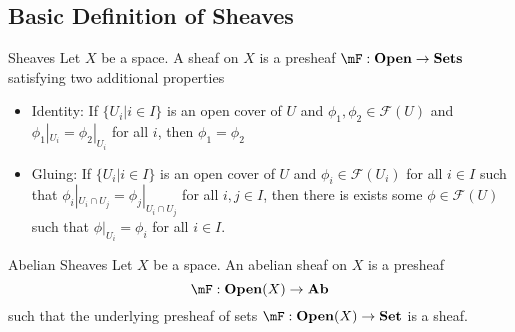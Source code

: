 \documentclass[a4paper]{article}
\begin{document}
\subsection{Basic Definition of Sheaves}
\begin{defn}{Sheaves}{} Let $X$ be a space. A sheaf on $X$ is a presheaf $\mF:\bold{Open}\to\bold{Sets}$ satisfying two additional properties
\begin{itemize}
\item Identity: If $\{U_i|i\in I\}$ is an open cover of $U$ and $\phi_1,\phi_2\in\mathcal{F}(U)$ and $\phi_1|_{U_i}=\phi_2|_{U_i}$ for all $i$, then $\phi_1=\phi_2$
\item Gluing: If $\{U_i|i\in I\}$ is an open cover of $U$ and $\phi_i\in\mathcal{F}(U_i)$ for all $i\in I$ such that $\phi_i|_{U_i\cap U_j}=\phi_j|_{U_i\cap U_j}$ for all $i,j\in I$, then there is exists some $\phi\in\mathcal{F}(U)$ such that $\phi|_{U_i}=\phi_i$ for all $i\in I$. 
\end{itemize}
\end{defn}

\begin{defn}{Abelian Sheaves}{} Let $X$ be a space. An abelian sheaf on $X$ is a presheaf $$\mF:\bold{Open}(X)\to\bold{Ab}$$ such that the underlying presheaf of sets $\mF:\bold{Open}(X)\to\bold{Set}$ is a sheaf. 
\end{defn}
\end{document}
